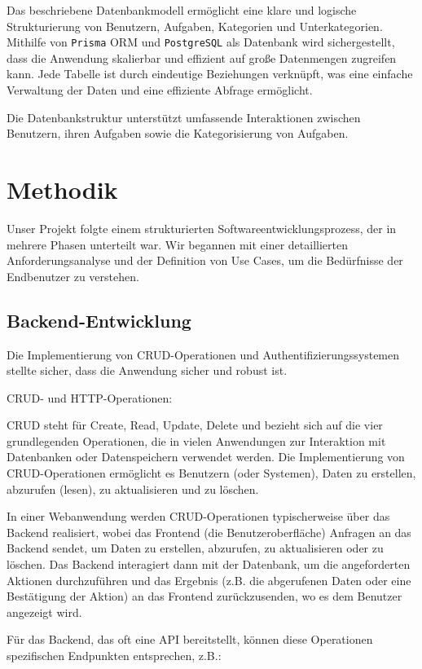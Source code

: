 \documentclass[12pt,a4paper]{scrartcl} %
\begin{document}
Das beschriebene Datenbankmodell ermöglicht eine klare und logische Strukturierung von Benutzern, Aufgaben, Kategorien und Unterkategorien. Mithilfe von \texttt{Prisma} ORM und \texttt{PostgreSQL} als Datenbank wird sichergestellt, dass die Anwendung skalierbar und effizient auf große Datenmengen zugreifen kann. Jede Tabelle ist durch eindeutige Beziehungen verknüpft, was eine einfache Verwaltung der Daten und eine effiziente Abfrage ermöglicht.


Die Datenbankstruktur unterstützt umfassende Interaktionen zwischen Benutzern, ihren Aufgaben sowie die Kategorisierung von Aufgaben.




\section{Methodik}
Unser Projekt folgte einem strukturierten Softwareentwicklungsprozess, der in mehrere Phasen unterteilt war. Wir begannen mit einer detaillierten Anforderungsanalyse und der Definition von Use Cases, um die Bedürfnisse der Endbenutzer zu verstehen.

\subsection{Backend-Entwicklung}
Die Implementierung von CRUD-Operationen und Authentifizierungssystemen stellte sicher, dass die Anwendung sicher und robust ist.

CRUD- und HTTP-Operationen:

CRUD steht für Create, Read, Update, Delete und bezieht sich auf die vier grundlegenden Operationen, die in vielen Anwendungen zur Interaktion mit Datenbanken oder Datenspeichern verwendet werden. Die Implementierung von CRUD-Operationen ermöglicht es Benutzern (oder Systemen), Daten zu erstellen, abzurufen (lesen), zu aktualisieren und zu löschen.

In einer Webanwendung werden CRUD-Operationen typischerweise über das Backend realisiert, wobei das Frontend (die Benutzeroberfläche) Anfragen an das Backend sendet, um Daten zu erstellen, abzurufen, zu aktualisieren oder zu löschen. Das Backend interagiert dann mit der Datenbank, um die angeforderten Aktionen durchzuführen und das Ergebnis (z.B. die abgerufenen Daten oder eine Bestätigung der Aktion) an das Frontend zurückzusenden, wo es dem Benutzer angezeigt wird.

Für das Backend, das oft eine API bereitstellt, können diese Operationen spezifischen Endpunkten entsprechen, z.B.:
\end{document}

